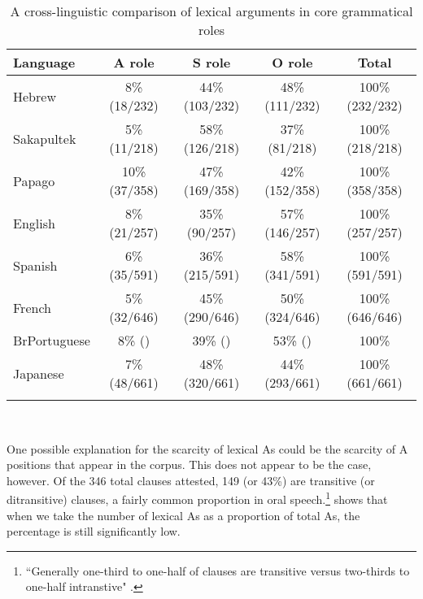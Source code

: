 \begin{table}

\caption{{A cross-linguistic comparison of lexical arguments in core grammatical roles}} 
\begin{tabular}{ l  c  c  c  c }
\lsptoprule
Language & A role & S role & O role & Total\\

\midrule
 Hebrew & 8{\%} (18/232) & 44{\%}(103/232) & 48{\%} (111/232) & 100{\%} (232/232) \\
  
 
 Sakapultek & 5{\%} (11/218) & 58{\%} (126/218)  & 37{\%} (81/218) &  100{\%} (218/218)  \\

 
Papago & 10{\%} (37/358) & 47{\%} (169/358)  & 42{\%} (152/358)  &  100{\%} (358/358) \\

 
English & 8{\%} (21/257) & 35{\%} (90/257)  & 57{\%} (146/257)  &  100{\%} (257/257) \\

 
Spanish & 6{\%} (35/591) & 36{\%} (215/591)  & 58{\%} (341/591)  &  100{\%} (591/591) \\

 
French & 5{\%} (32/646) & 45{\%} (290/646)  & 50{\%} (324/646)  &  100{\%} (646/646)  \\
 
 
BrPortuguese & 8{\%} () & 39{\%} ()  & 53{\%} ()  &  100{\%}  \\

 
Japanese & 7{\%} (48/661) & 48{\%} (320/661)  & 44{\%} (293/661)  &  100{\%} (661/661) \\

\lspbottomrule
\end{tabular}\\
\label{crossgeneraldist}

\end{table}


One possible explanation for the scarcity of lexical As could be the scarcity of A positions that appear in the corpus. This does not appear to be the case, however. Of the 346 total clauses attested, 149 (or 43{\%}) are transitive (or ditransitive) clauses, a fairly common proportion in oral speech.\footnote{``Generally one-third to one-half of clauses are transitive versus two-thirds to one-half intranstive"  \citep[63-64]{dubois2003a}.}  shows that when we take the number of lexical As as a proportion of total As, the percentage is still significantly low.

